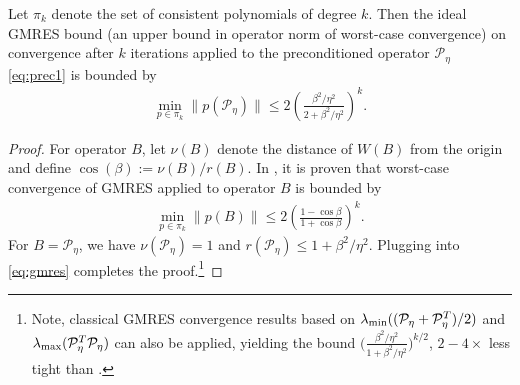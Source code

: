 \documentclass[review]{siamart}
\begin{document}
%
\begin{corollary}\label{cor:gmres}
Let $\pi_k$ denote the set of consistent polynomials of degree $k$. Then the ideal GMRES bound
(an upper bound in operator norm of worst-case convergence) on convergence after $k$ iterations
applied to the preconditioned operator $\mathcal{P}_\eta$ \eqref{eq:prec1} is bounded by
\begin{align*}
\min_{p\in\pi_k} \|p(\mathcal{P}_\eta)\| \leq 2\left(\frac{\beta^2/\eta^2}{2 + \beta^2/\eta^2}\right)^k.
\end{align*}
\end{corollary}
\begin{proof}
For operator $B$, let $\nu(B)$ denote the distance of $W(B)$ from the origin and define
$\cos(\beta) := \nu(B) / r(B)$. In \cite[Lemma 3.2]{liesen2012field}, it is proven that worst-case convergence of GMRES applied to operator $B$ is bounded by
%
\begin{align}\label{eq:gmres}
\min_{p\in\pi_k} \|p(B)\| \leq 2\left(\frac{1-\cos\beta}{1+\cos\beta}\right)^k.
\end{align}
%
For $B = \mathcal{P}_\eta$, we have $\nu(\mathcal{P}_\eta)= 1$ and $r(\mathcal{P}_\eta) \leq 1+\beta^2/\eta^2$.
Plugging into \eqref{eq:gmres} completes the proof.\footnote{Note, classical GMRES convergence
results based on $\lambda_{\textnormal{min}}((\mathcal{P}_\eta+\mathcal{P}_\eta^T)/2)$ and
$\lambda_{\textnormal{max}}(\mathcal{P}_\eta^T\mathcal{P}_\eta)$ can also be applied, yielding
the bound $\Big(\tfrac{\beta^2/\eta^2}{1 + \beta^2/\eta^2}\Big)^{k/2}$, $2-4\times$
less tight than .}
\end{proof}
%
\end{document}
